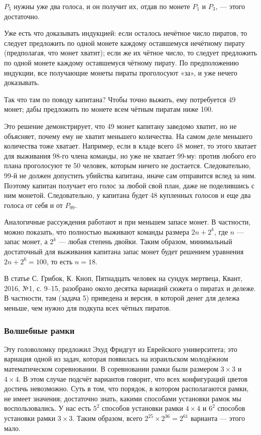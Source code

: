 $P_5$ нужны уже два голоса, и он получит их, отдав по монете $P_1$ и $P_3$, --- этого достаточно.

Уже есть что доказывать индукцией:
если осталось нечётное число пиратов, то следует предложить по одной монете каждому оставшемуся нечётному пирату (предполагая, что монет хватит);
если же их чётное число, то следует предложить по одной монете каждому оставшемуся чётному пирату.
По предположению индукции, все получающие монеты пираты проголосуют «за», и уже нечего доказывать.

Так что там по поводу капитана?
Чтобы точно выжить, ему потребуется 49 монет; дабы предложить по монете всем чётным пиратам ниже 100.

\begin{addedbytheeditors}
   Это решение демонстрирует, что 49 монет капитану заведомо хватит, но не объясняет, почему ему не хватит меньшего количества. На самом деле меньшего количества тоже хватает. Например, если в кладе всего 48 монет, то этого хватает для выживания 98-го члена команды, но уже не хватает 99-му: против любого его плана проголосуют те 50 человек, которым ничего не достается. Следовательно, 99-й не должен допустить убийства капитана, иначе сам отправится вслед за ним. Поэтому капитан получает его голос за любой свой план, даже не поделившись с ним монетой. Следовательно, у капитана будет 48 купленных голосов и еще два голоса от себя и от $P_{99}$.   

   Аналогичные рассуждения работают и при меньшем запасе монет. В частности, можно показать, что полностью выживают команды размера $2n+2^k$, где $n$ --- запас монет, а $2^k$ --- любая степень двойки. Таким образом, минимальный достаточный для выживания капитана запас монет будет решением уравнения $2n+2^6=100$, то есть $n=18$. 

   В статье  С. Грибок, К. Кноп, Пятнадцать человек на сундук мертвеца, Квант, 2016, №1, с. 9–15, разобрано около десятка вариаций сюжета о пиратах и дележе. В частности, там (задача 5) приведена и версия, в которой денег для дележа меньше, чем нужно для подкупа всех чётных пиратов.
\end{addedbytheeditors}


\subsubsection*{Волшебные рамки}

Эту головоломку предложил Эхуд Фридгут из Еврейского университета; это вариация одной из задач, которая появилась на израильском молодёжном математическом соревновании.
В соревновании рамки были размером $3 \times 3$ и $4 \times 4$.
В этом случае подсчёт вариантов говорит, что всех конфигураций цветов достичь невозможно.
Суть в том, что порядок, в котором располагаются рамки, не имеет значения;
достаточно знать, какими способами установки рамок мы воспользовались.
У нас есть $5^2$ способов установки рамки $4 \times 4$
и $6^2$ способов установки рамки $3 \times 3$.
Таким образом, всего $2^{25} \times 2^{36} = 2^{61}$ варианта — этого мало.


